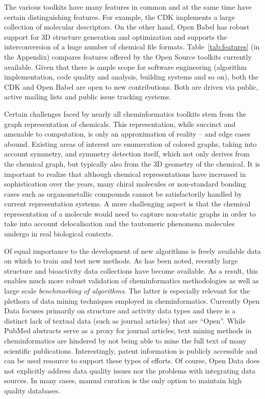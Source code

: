 \documentclass{sig-alternate}
\begin{document}
The various toolkits have many features in common and at the same time
have certain distinguishing features. For example, the CDK implements
a large collection of molecular descriptors. On the other hand, Open
Babel has robust support for 3D structure generation and optimization
and supports the interconversion of a huge number of chemical file
formats. Table~\ref{tab:features} (in the Appendix) compares features
offered by the Open Source toolkits currently available.  Given that
there is ample scope for software engineering (algorithm
implementation, code quality and analysis, building systems and so on), both
the CDK and Open Babel are open to new contributions. Both are driven
via public, active mailing lists and public issue tracking systems.

Certain challenges faced by nearly all cheminformatics toolkits stem
from the graph representation of chemicals. This representation, while
succinct and amenable to computation, is only an approximation of
reality -- and edge cases abound. Existing areas of interest are
enumeration of colored graphs, taking into account symmetry, and
symmetry detection itself, which not only derives from the chemical
graph, but typically also from the 3D geometry of the chemical. It is
important to realize that although chemical representations have
increased in sophistication over the years, many chiral molecules or
non-standard bonding cases such as organometallic compounds cannot be
satisfactorily handled by current representation systems. A more
challenging aspect is that the chemical representation of a molecule
would need to capture non-static graphs in order to take into
account delocalisation and the tautomeric phenomena molecules undergo
in real biological contexts.

Of equal importance to the development of new algorithms is freely
available data on which to train and test new methods. As has been
noted, recently large structure and bioactivity data collections have
become available. As a result, this enables much more robust
validation of cheminformatics methodologies as well as large scale
\emph{benchmarking of algorithms}. The latter is especially relevant
for the plethora of data mining techniques employed in
cheminformatics. Currently Open Data focuses primarily on structure
and activity data types and there is a distinct lack of textual data
(such as journal articles) that are ``Open''. While PubMed abstracts
serve as a proxy for journal articles, text mining methods in
cheminformatics are hindered by not being able to mine the full text
of many scientific publications.  Interestingly, patent information is
publicly accessible and can be used resource to support these types of
efforts. Of course, Open Data does not explicitly address data quality
issues nor the problems with integrating data sources. In many cases,
manual curation is the only option to maintain high quality databases.
\end{document}
